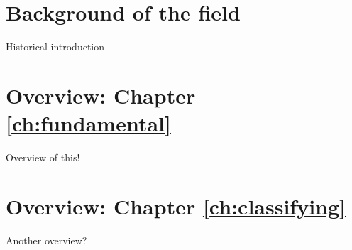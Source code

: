 
\section{Background of the field}

Historical introduction

\section{Overview: Chapter \ref{ch:fundamental}}

Overview of this!

\section{Overview: Chapter \ref{ch:classifying}}

Another overview?